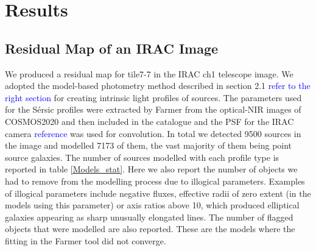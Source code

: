 \section{Results}

\subsection{Residual Map of an IRAC Image}
We produced a residual map for tile7-7 in the IRAC ch1 telescope image. We adopted the model-based photometry method described in section 2.1 \textcolor{blue}{refer to the right section} for creating intrinsic light profiles of sources. The parameters used for the Sérsic profiles were extracted by Farmer from the optical-NIR images of COSMOS2020 and then included in the catalogue and the PSF for the IRAC camera \textcolor{blue}{reference} was used for convolution. In total we detected 9500 sources in the image and modelled 7173 of them, the vast majority of them being point source galaxies. The number of sources modelled with each profile type is reported in table \ref{Models_stat}. Here we also report the number of objects we had to remove from the modelling process due to illogical parameters. Examples of illogical parameters include negative fluxes, effective radii of zero extent (in the models using this parameter) or axis ratios above 10, which produced elliptical galaxies appearing as sharp unusually elongated lines. The number of flagged objects that were modelled are also reported. These are the models where the fitting in the Farmer tool did not converge. \\
